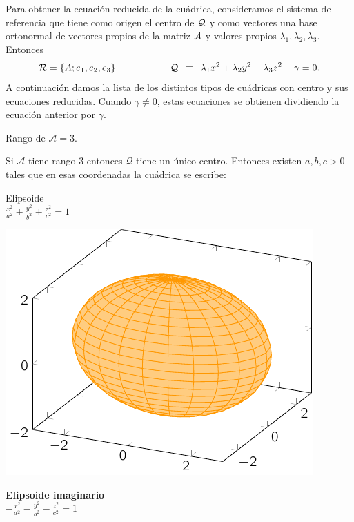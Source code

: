 \documentclass[11pt, a4paper]{article}
\newif\IfInSansMode
\theoremstyle{theorem-style}
\theoremstyle{definition-style}
\theoremstyle{remark-style}
\theoremstyle{example-style}
\begin{document}
Para obtener la ecuaci\'on reducida de la cu\'adrica, consideramos el sistema de referencia que tiene como origen el centro de $\cal Q$ y como vectores una base ortonormal de vectores propios de la matriz $\cal A$ y valores propios $\lambda_1,\lambda_2,\lambda_3$. Entonces
\[
{\cal R} =\{A; {e}_1, {e}_2, {e}_3 \}
\hspace{2cm}
{\cal Q} \, \, \, \equiv \, \, \, \lambda_1 {x}^2 +\lambda_2 {y}^2 +\lambda_3 {z}^2 +
{\gamma} = 0.
\]
A continuaci\'on damos la lista de los distintos tipos de cu\'adricas con centro y  sus ecuaciones reducidas. Cuando ${\gamma}\neq 0$, estas ecuaciones se obtienen dividiendo la ecuaci\'on anterior por ${\gamma}$. 

Rango de $\mathcal A = 3$.

Si $\mathcal A$ tiene rango $3$ entonces $\mathcal Q$ tiene un único centro.
Entonces existen $a,b,c > 0$ tales que en esas coordenadas la cuádrica se escribe: 

\begin{minipage}[c]{0.45\textwidth}
  {Elipsoide}\vspace{1em}\\
  $\displaystyle \frac{{x}^2}{a^2} + \frac{{y}^2}{b^2}+\frac{{z}^2}{c^2} = 1$
\end{minipage}\hfill
\begin{minipage}[]{0.45\textwidth}
    \includegraphics{./img/elde.pdf}
\end{minipage}

\begin{minipage}[c]{0.45\textwidth}
  {\bf Elipsoide imaginario}\vspace{1em}\\
  $\displaystyle -\frac{{x}^2}{a^2} - \frac{{y}^2}{b^2} - \frac{{z}^2}{c^2} = 1$
\end{minipage}\hfill
\begin{minipage}[]{0.45\textwidth}
\hfill
\end{minipage}
\end{document}

